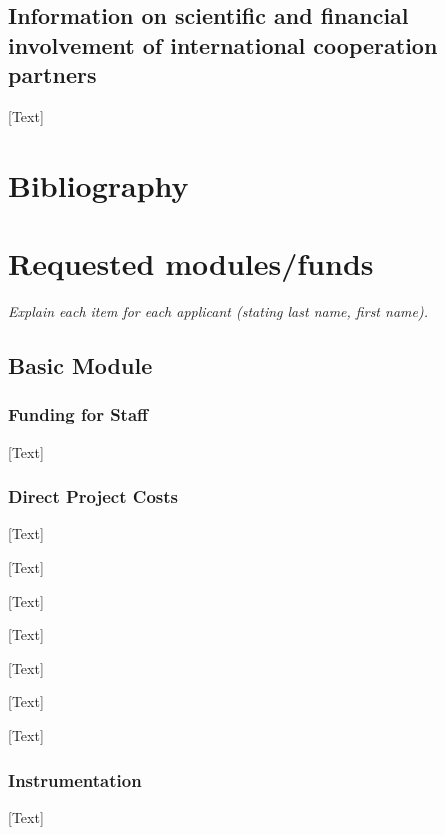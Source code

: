 \documentclass[red]{dfg_proposal_en}
\begin{document}
\subsection{Information on scientific and financial involvement of international cooperation partners}  %
[Text]


\section{Bibliography}  %
\renewcommand{\refname}{}




\section{Requested modules/funds}  %
\textit{Explain each item for each applicant (stating last name, first name).}

\subsection{Basic Module}  %

\subsubsection{Funding for Staff}  %

[Text]

\subsubsection{Direct Project Costs}  %
[Text]

[Text]

[Text]

[Text]

[Text]

[Text]

[Text]

\subsubsection{Instrumentation}
[Text]
\end{document}
